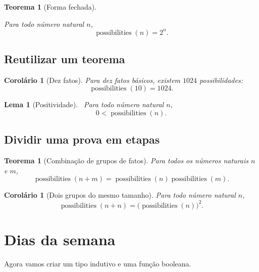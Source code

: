 \documentclass[11pt,a4paper]{article}
\theoremstyle{definition}
\theoremstyle{plain}
\newtheorem{theorem}[definition]{Teorema}
\newtheorem{lemma}[definition]{Lema}
\newtheorem{corollary}[definition]{Corolário}
\begin{document}
\begin{theorem}[Forma fechada]
\label{possibilities_pow}

Para todo número natural $n$,
\[
  \operatorname{possibilities}(n)=2^n.
\]
\end{theorem}

\subsection{Reutilizar um teorema}

\begin{corollary}[Dez fatos]
\label{possibilities_ten}
Para dez fatos básicos, existem $1024$ possibilidades:
\[
  \operatorname{possibilities}(10)=1024.
\]
\end{corollary}

\begin{lemma}[Positividade]
\label{possibilities_positive}\
Para todo número natural $n$,
\[
  0<\operatorname{possibilities}(n).
\]
\end{lemma}

\subsection{Dividir uma prova em etapas}

\begin{theorem}[Combinação de grupos de fatos]
\label{possibilities_add}
Para todos os números naturais $n$ e $m$,
\[
  \operatorname{possibilities}(n+m)
  =\operatorname{possibilities}(n)
   \operatorname{possibilities}(m).
\]
\end{theorem}


\begin{corollary}[Dois grupos do mesmo tamanho]
\label{possibilities_double}
Para todo número natural $n$,
\[
  \operatorname{possibilities}(n+n)
  =\bigl(\operatorname{possibilities}(n)\bigr)^2.
\]
\end{corollary}

\section{Dias da semana}

Agora vamos criar um tipo indutivo e uma função booleana.
\end{document}
